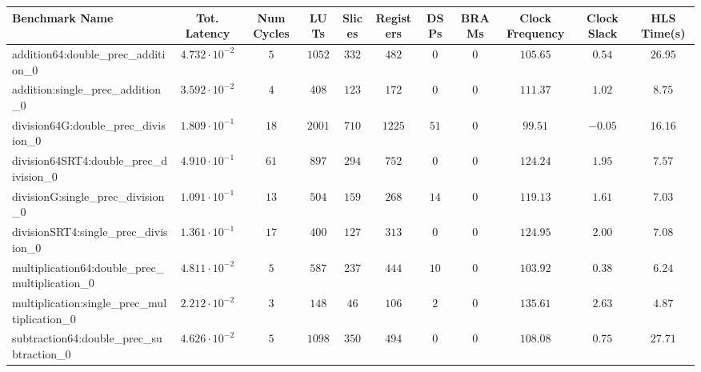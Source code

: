 \begin{tabular}{|l|c|c|c|c|c|c|c|c|c|c|}
\hline
Benchmark Name                                   & Tot. Latency            & Num Cycles & LUTs     & Slices   & Registers & DSPs   & BRAMs & Clock Frequency & Clock Slack & HLS Time(s) \\
\hline
addition64:double\_prec\_addition\_0             & $ 4.732 \cdot 10^{-2} $ & $ 5      $ & $ 1052 $ & $ 332  $ & $ 482   $ & $ 0  $ & $ 0 $ & $ 105.65      $ & $ 0.54    $ & $ 26.95   $ \\
addition:single\_prec\_addition\_0               & $ 3.592 \cdot 10^{-2} $ & $ 4      $ & $ 408  $ & $ 123  $ & $ 172   $ & $ 0  $ & $ 0 $ & $ 111.37      $ & $ 1.02    $ & $ 8.75    $ \\
division64G:double\_prec\_division\_0            & $ 1.809 \cdot 10^{-1} $ & $ 18     $ & $ 2001 $ & $ 710  $ & $ 1225  $ & $ 51 $ & $ 0 $ & $ 99.51       $ & $ -0.05   $ & $ 16.16   $ \\
division64SRT4:double\_prec\_division\_0         & $ 4.910 \cdot 10^{-1} $ & $ 61     $ & $ 897  $ & $ 294  $ & $ 752   $ & $ 0  $ & $ 0 $ & $ 124.24      $ & $ 1.95    $ & $ 7.57    $ \\
divisionG:single\_prec\_division\_0              & $ 1.091 \cdot 10^{-1} $ & $ 13     $ & $ 504  $ & $ 159  $ & $ 268   $ & $ 14 $ & $ 0 $ & $ 119.13      $ & $ 1.61    $ & $ 7.03    $ \\
divisionSRT4:single\_prec\_division\_0           & $ 1.361 \cdot 10^{-1} $ & $ 17     $ & $ 400  $ & $ 127  $ & $ 313   $ & $ 0  $ & $ 0 $ & $ 124.95      $ & $ 2.00    $ & $ 7.08    $ \\
multiplication64:double\_prec\_multiplication\_0 & $ 4.811 \cdot 10^{-2} $ & $ 5      $ & $ 587  $ & $ 237  $ & $ 444   $ & $ 10 $ & $ 0 $ & $ 103.92      $ & $ 0.38    $ & $ 6.24    $ \\
multiplication:single\_prec\_multiplication\_0   & $ 2.212 \cdot 10^{-2} $ & $ 3      $ & $ 148  $ & $ 46   $ & $ 106   $ & $ 2  $ & $ 0 $ & $ 135.61      $ & $ 2.63    $ & $ 4.87    $ \\
subtraction64:double\_prec\_subtraction\_0       & $ 4.626 \cdot 10^{-2} $ & $ 5      $ & $ 1098 $ & $ 350  $ & $ 494   $ & $ 0  $ & $ 0 $ & $ 108.08      $ & $ 0.75    $ & $ 27.71   $ \\

\end{tabular}
